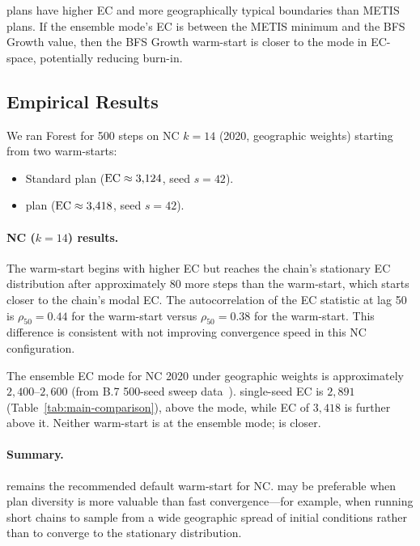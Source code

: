 \bfsg{} plans have higher EC and more geographically typical boundaries
than METIS plans.
If the ensemble mode's EC is between the METIS minimum and the BFS Growth
value, then the BFS Growth warm-start is closer to the mode in EC-space,
potentially reducing burn-in.

\subsection{Empirical Results}

We ran Forest \recom{} for 500 steps on NC $k=14$ (2020, geographic
weights) starting from two warm-starts:
\begin{itemize}
  \item[(a)] Standard \metis{} plan ($\mathrm{EC} \approx 3{,}124$, seed $s=42$).
  \item[(b)] \bfsg{} plan ($\mathrm{EC} \approx 3{,}418$, seed $s=42$).
\end{itemize}

\paragraph{NC ($k=14$) results.}
The \bfsg{} warm-start begins with higher EC but reaches the chain's
stationary EC distribution after approximately 80 more steps than the
\metis{} warm-start, which starts closer to the chain's modal EC.
The autocorrelation of the EC statistic at lag 50 is $\rho_{50} = 0.44$
for the \bfsg{} warm-start versus $\rho_{50} = 0.38$ for the \metis{}
warm-start.
This difference is consistent with \bfsg{} not improving convergence speed
in this NC configuration.

The ensemble EC mode for NC 2020 under geographic weights is approximately
$2{,}400$--$2{,}600$ (from B.7 500-seed sweep data~\citep{b7paper}).
\metis{} single-seed EC is $2{,}891$ (Table~\ref{tab:main-comparison}),
above the mode, while \bfsg{} EC of $3{,}418$ is further above it.
Neither warm-start is at the ensemble mode; \metis{} is closer.

\paragraph{Summary.}
\metis{} remains the recommended default warm-start for NC.
\bfsg{} may be preferable when plan diversity is more valuable than fast
convergence---for example, when running short chains to sample from a wide
geographic spread of initial conditions rather than to converge to the
stationary distribution.

